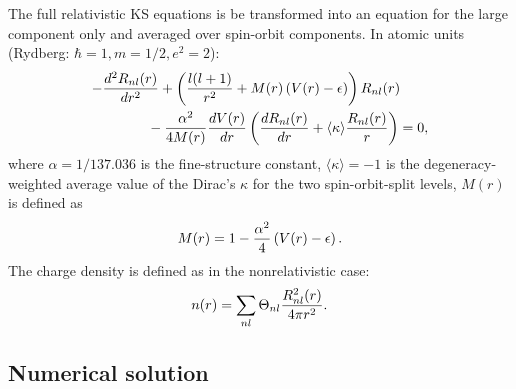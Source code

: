 The full relativistic KS equations
is be transformed into an equation for the large component only
and averaged over spin-orbit components. In atomic units
(Rydberg: $\hbar=1, m=1/2, e^2=2$):
\begin{eqnarray}
-{d^2 R_{nl}(r)\over dr^2}
+\left( {l(l+1)\over r^2} + M(r)\left(V(r)-\epsilon\right)
\right) R_{nl}(r) \qquad \nonumber \\ \mbox{} -
 {\alpha^2\over 4M(r)} {dV(r)\over dr} 
                    \left({dR_{nl}(r)\over dr} +
                          \langle\kappa\rangle {R_{nl}(r)\over r}\right)= 0,
\end{eqnarray}
where $\alpha=1/137.036$ is the fine-structure constant,
$\langle\kappa\rangle=-1$ is the degeneracy-weighted average value 
of the Dirac's $\kappa$ for the two spin-orbit-split levels, $M(r)$ is
defined as
\begin{equation}
M(r)= 1 - {\alpha^2\over 4} \left(V(r)-\epsilon\right).
\end{equation}
The charge density is defined as in the nonrelativistic case:
\begin{equation}
n(r) = \sum_{nl} \Theta_{nl}{R^2_{nl}(r)\over 4\pi r^2}.
\end{equation}

\subsection{Numerical solution} 

